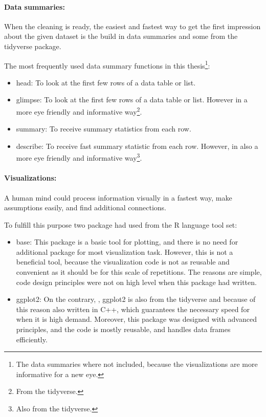 		\paragraph{Data summaries:}
		When the cleaning is ready, the easiest and fastest way to get the first impression about the given dataset is the build in data summaries and some from the tidyverse package.

		The most frequently used data summary functions in this thesis\footnote{The data summaries where not included, because the visualizations are more informative for a new eye.}:
		\begin{itemize}
			\item{head:} To look at the first few rows of a data table or list.
			\item{glimpse:} To look at the first few rows of a data table or list. However in a more eye friendly and informative way\footnote{From the tidyverse.}.
			\item{summary:} To receive summary statistics from each row.
			\item{describe:} To receive fast summary statistic from each row. However, in also a more eye friendly and informative way\footnote{Also from the tidyverse.}.
		\end{itemize}
		\paragraph{Visualizations:}
		A human mind could process information visually in a fastest way, make assumptions easily, and find additional connections. 

		To fulfill this purpose two package had used from the R language tool set:
		\begin{itemize}
			\item{base:} This package is a basic tool for plotting, and there is no need for additional package for most visualization task. However, this is not a beneficial tool, because the visualization code is not as reusable and convenient as it should be for this scale of repetitions. The reasons are simple, code design principles were not on high level when this package had written.
			\item{ggplot2:} On the contrary, , ggplot2 is also from the tidyverse and because of this reason also written in C++, which guarantees the necessary speed for when it is high demand. Moreover, this package was designed with advanced principles, and the code is mostly reusable, and handles data frames efficiently. 
		\end{itemize} 


